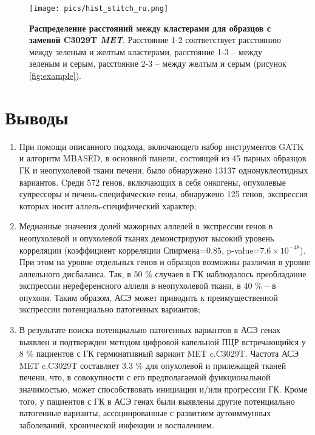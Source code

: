 \begin{figure}[H]
	\centering
	\texttt{[image: pics/hist\_stitch\_ru.png]}
	\caption{\textbf{Распределение расстояний между кластерами для образцов с заменой C3029T \textit{MET}}. Расстояние 1-2 соответствует расстоянию между зеленым и желтым кластерами, расстояние 1-3 -- между зеленым и серым, расстояние 2-3 -- между желтым и серым (рисунок \ref{fig:example}).}
	\label{fig:hist}
\end{figure}

\newpage

\section{Выводы}

\begin{enumerate}
	\item При помощи описанного подхода, включающего набор инструментов GATK и алгоритм MBASED, в основной панели, состоящей из 45 парных образцов ГК и неопухолевой ткани печени, было обнаружено 13137 однонуклеотидных вариантов. Cреди 572 генов, включающих в себя онкогены, опухолевые супрессоры и печень-специфические гены, обнаружено 125 генов, экспрессия которых носит аллель-специфический характер;
	\item Медианные значения долей мажорных аллелей в экспрессии генов в неопухолевой и опухолевой тканях демонстрируют высокий уровень корреляции (коэффициент корреляции Спирмена=$0.85$, p-value=$7.6\times10^{-48}$). При этом на уровне отдельных генов и образцов возможны различия в уровне аллельного дисбаланса. Так, в 50 \% случаев в ГК наблюдалось преобладание экспрессии нереференсного аллеля в неопухолевой ткани, в 40 \% -- в опухоли. Таким образом, АСЭ может приводить к преимущественной экспрессии потенциально патогенных вариантов;
	\item В результате поиска потенциально патогенных вариантов в АСЭ генах выявлен и подтвержден методом цифровой капельной ПЦР встречающийся у 8 \% пациентов с ГК герминативный вариант MET c.C3029T. Частота АСЭ MET c.C3029T составляет 3.3 \% для опухолевой и прилежащей тканей печени, что, в совокупности с его предполагаемой функциональной значимостью, может способствовать инициации и/или прогрессии ГК. Кроме того, у пациентов с ГК в АСЭ генах были выявлены другие потенциально патогенные варианты, ассоциированные с развитием аутоиммунных заболеваний, хронической инфекции и воспалением.
\end{enumerate}